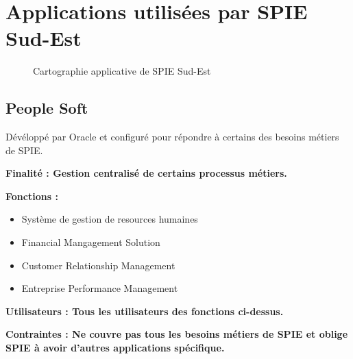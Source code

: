 \section{Applications utilisées par SPIE Sud-Est}

\begin{figure}[H]
    \label{fig-LABEL-DE-LA-FIGURE}
    \noindent{}
    \caption{Cartographie applicative de SPIE Sud-Est}
\end{figure}

\subsection{People Soft}
Dévéloppé par Oracle et configuré pour répondre à certains des besoins métiers de SPIE.
\begin{description}
    \item \bf{Finalité :} Gestion centralisé de certains processus métiers. \\
    \item \bf{Fonctions :}
    \begin{itemize}
        \item Système de gestion de resources humaines
        \item Financial Mangagement Solution
        \item Customer Relationship Management
        \item Entreprise Performance Management \\
    \end{itemize}
    \item \bf{Utilisateurs :} Tous les utilisateurs des fonctions ci-dessus. \\
    \item \bf{Contraintes :} Ne couvre pas tous les besoins métiers de SPIE et oblige SPIE à avoir d’autres applications spécifique.
\end{description}

